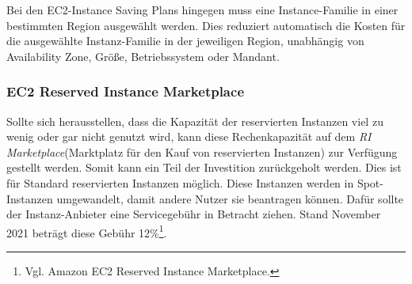 Bei den EC2-Instance Saving Plans hingegen muss eine Instance-Familie in einer bestimmten Region ausgewählt werden.  Dies reduziert automatisch die Kosten für die ausgewählte Instanz-Familie in der jeweiligen Region, unabhängig von Availability Zone, Größe, Betriebssystem oder Mandant.

\subsubsection*{EC2 Reserved Instance Marketplace}\label{sssec:RI-Marketplace}
Sollte sich herausstellen, dass die Kapazität der reservierten Instanzen viel zu wenig oder gar nicht genutzt wird, kann diese Rechenkapazität auf dem \textit{RI Marketplace}(Marktplatz für den Kauf von reservierten Instanzen) zur Verfügung gestellt werden. Somit kann ein Teil der Investition zurückgeholt werden. Dies ist für Standard reservierten Instanzen möglich.
Diese Instanzen werden in Spot-Instanzen umgewandelt, damit andere Nutzer sie beantragen können. Dafür sollte der Instanz-Anbieter eine Servicegebühr in Betracht ziehen. Stand November 2021 beträgt diese Gebühr 12\%\footnote{Vgl. Amazon EC2 Reserved Instance Marketplace\cite{AMZ23}.}.

